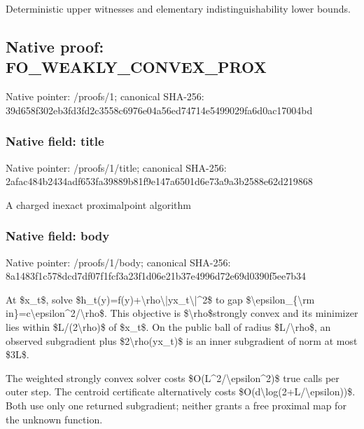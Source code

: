 \documentclass[10pt,a4paper]{article}
\begin{document}
Deterministic upper witnesses and elementary indistinguishability lower bounds.


\subsection{Native proof: FO\_WEAKLY\_CONVEX\_PROX}


Native pointer: /proofs/1; canonical SHA-256: 39d658f302eb3fd3fd2c3558\allowbreak{}c6976e04a56ed74714e54990\allowbreak{}29fa6d0ac17004bd



\subsubsection{Native field: title}


Native pointer: /proofs/1/title; canonical SHA-256: 2afac484b2434adf653fa398\allowbreak{}89b81f9e147a6501d6e73a9a\allowbreak{}3b2588e62d219868


A charged inexact proximalpoint algorithm


\subsubsection{Native field: body}


Native pointer: /proofs/1/body; canonical SHA-256: 8a1483f1c578dcd7df07f1fc\allowbreak{}f3a23f1d06e21b37e4996d72\allowbreak{}e69d0390f5ee7b34


At \$x\_t\$, solve \$h\_t(y)=f(y)+\textbackslash{}rho\textbackslash{}|yx\_t\textbackslash{}|\textasciicircum{}2\$ to gap
\$\textbackslash{}epsilon\_\{\textbackslash{}rm in\}=c\textbackslash{}epsilon\textasciicircum{}2/\textbackslash{}rho\$.
This objective is \$\textbackslash{}rho\$strongly convex and its minimizer lies within \$L/(2\textbackslash{}rho)\$ of \$x\_t\$. On the public ball of radius \$L/\textbackslash{}rho\$, an observed subgradient plus \$2\textbackslash{}rho(yx\_t)\$ is an inner subgradient of norm at most \$3L\$.

The weighted strongly convex solver costs \$O(L\textasciicircum{}2/\textbackslash{}epsilon\textasciicircum{}2)\$ true calls per outer step. The centroid certificate alternatively costs \$O(d\textbackslash{}log(2+L/\textbackslash{}epsilon))\$. Both use only one returned subgradient; neither grants a free proximal map for the unknown function.
\end{document}
